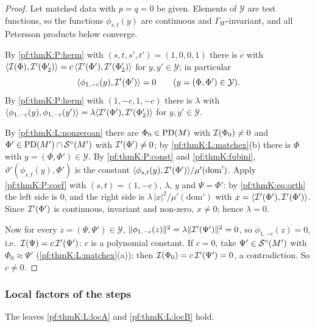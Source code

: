 \begin{proof}
Let matched data with $p=q=0$ be given. Elements of $\mathcal Y$ are test functions, so the functions $\phi_{s,t}(y)$ are
continuous and $\Gamma_W$-invariant, and all Petersson products below converge.

By \ref{pf:thmK:P:herm} with $(s,t,s',t')=(1,0,0,1)$ there is $c$ with $\langle\mathcal{I}(\Phi),\mathcal{I}'(\Phi'_2)\rangle=c\,
\langle\mathcal{I}'(\Phi'),\mathcal{I}'(\Phi'_2)\rangle$ for $y,y'\in\mathcal Y$; in particular
\begin{equation}\label{pf:thmK:eq:orth}
\langle\phi_{1,-c}(y),\mathcal{I}'(\Phi')\rangle=0\qquad(y=(\Phi,\Phi')\in\mathcal Y).
\end{equation}
By \ref{pf:thmK:P:herm} with $(1,-c,1,-c)$ there is $\lambda$ with $\langle\phi_{1,-c}(y),\phi_{1,-c}(y')\rangle=\lambda\langle
\mathcal{I}'(\Phi'),\mathcal{I}'(\Phi'_2)\rangle$ for $y,y'\in\mathcal Y$.

By \ref{pf:thmK:L:nonzeroan} there are $\Phi_0\in\operatorname{PD}(M)$ with $\mathcal{I}(\Phi_0)\ne0$ and $\Phi'\in\operatorname{PD}(M')\cap\mathcal{S}^{\circ}(M')$
with $\mathcal{I}'(\Phi')\ne0$; by \ref{pf:thmK:L:matchex}(b) there is $\Phi$ with $y=(\Phi,\Phi')\in\mathcal Y$. By
\ref{pf:thmK:P:const} and \cref{pf:thmK:fubini}, $\vartheta'(\phi_{s,t}(y),\Phi')$ is the constant
$\langle\phi_{s,t}(y),\mathcal{I}'(\Phi')\rangle/\mu'(\mathrm{dom}')$. Apply \ref{pf:thmK:P:coef} with $(s,t)=(1,-c)$, $\lambda$, $y$
and $\Psi=\Phi'$: by \eqref{pf:thmK:eq:orth} the left side is $0$, and the right side is $\lambda\,|x|^2/\mu'(\mathrm{dom}')$
with $x=\langle\mathcal{I}'(\Phi'),\mathcal{I}'(\Phi')\rangle$. Since $\mathcal{I}'(\Phi')$ is continuous, invariant and non-zero, $x\ne0$;
hence $\lambda=0$.

Now for every $z=(\Psi,\Psi')\in\mathcal Y$, $\|\phi_{1,-c}(z)\|^2=\lambda\|\mathcal{I}'(\Psi')\|^2=0$, so $\phi_{1,-c}(z)=0$, i.e.\
$\mathcal{I}(\Psi)=c\,\mathcal{I}'(\Psi')$: $c$ is a polynomial constant. If $c=0$, take $\Psi'\in\mathcal{S}^{\circ}(M')$ with $\Phi_0\approx\Psi'$
(\ref{pf:thmK:L:matchex}(a)); then $\mathcal{I}(\Phi_0)=c\,\mathcal{I}'(\Psi')=0$, a contradiction. So $c\ne0$.
\end{proof}

\subsubsection{Local factors of the steps}\label{sec:pf:thmK:loc}

\begin{proposition}\label{pf:thmK:locAB}
The leaves \ref{pf:thmK:L:locA} and \ref{pf:thmK:L:locB} hold.
\end{proposition}

